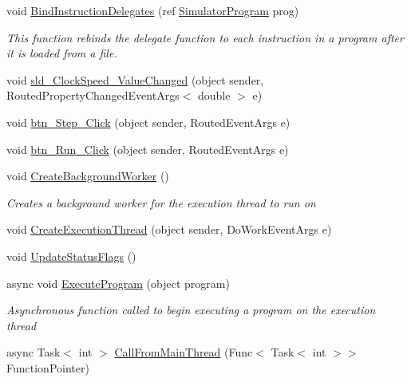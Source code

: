 \begin{DoxyCompactItemize}
void \hyperlink{class_c_p_u___o_s___simulator_1_1_main_window_afe4c815db0eb51ebc480374f5af09d0c}{Bind\+Instruction\+Delegates} (ref \hyperlink{class_c_p_u___o_s___simulator_1_1_c_p_u_1_1_simulator_program}{Simulator\+Program} prog)
\begin{DoxyCompactList}\small\item\em This function rebinds the delegate function to each instruction in a program after it is loaded from a file. \end{DoxyCompactList}\item 
void \hyperlink{class_c_p_u___o_s___simulator_1_1_main_window_ace253c0b4beef8898af97df25666df2f}{sld\+\_\+\+Clock\+Speed\+\_\+\+Value\+Changed} (object sender, Routed\+Property\+Changed\+Event\+Args$<$ double $>$ e)
\item 
void \hyperlink{class_c_p_u___o_s___simulator_1_1_main_window_a897049d123dd2ecf2820b02205ce1969}{btn\+\_\+\+Step\+\_\+\+Click} (object sender, Routed\+Event\+Args e)
\item 
void \hyperlink{class_c_p_u___o_s___simulator_1_1_main_window_a1f4dedca9ad81ea1c92637759515797f}{btn\+\_\+\+Run\+\_\+\+Click} (object sender, Routed\+Event\+Args e)
\item 
void \hyperlink{class_c_p_u___o_s___simulator_1_1_main_window_ad225bd7394d6ad45de9db58b562b91f7}{Create\+Background\+Worker} ()
\begin{DoxyCompactList}\small\item\em Creates a background worker for the execution thread to run on \end{DoxyCompactList}\item 
void \hyperlink{class_c_p_u___o_s___simulator_1_1_main_window_a83ba6352a96515569978030013c84b72}{Create\+Execution\+Thread} (object sender, Do\+Work\+Event\+Args e)
\item 
void \hyperlink{class_c_p_u___o_s___simulator_1_1_main_window_a8230feb5feca0e0cb95a8bd7e228426b}{Update\+Status\+Flags} ()
\item 
async void \hyperlink{class_c_p_u___o_s___simulator_1_1_main_window_a03d4ec6b5990ad572db709f5305dd7ca}{Execute\+Program} (object program)
\begin{DoxyCompactList}\small\item\em Asynchronous function called to begin executing a program on the execution thread \end{DoxyCompactList}\item 
async Task$<$ int $>$ \hyperlink{class_c_p_u___o_s___simulator_1_1_main_window_a0712c91c3a03a4fabc2cdb2f4ed0a33b}{Call\+From\+Main\+Thread} (Func$<$ Task$<$ int $>$$>$ Function\+Pointer)
$$
\end{DoxyCompactItemize}
